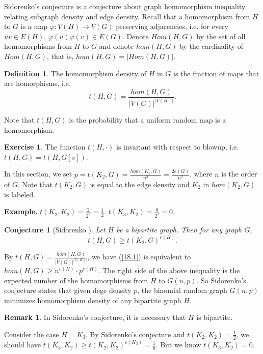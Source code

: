 \documentclass{article}
\newtheorem{conjecture}[theorem]{Conjecture}
\theoremstyle{definition}
\newtheorem{remark}[theorem]{Remark}
\newtheorem{definition}[theorem]{Definition}
\newtheorem{exercise}[theorem]{Exercise}
\renewcommand{\phi}{\varphi}
\begin{document}
Sidorenko's conjecture is a conjecture about graph homomorphism inequality relating subgraph density and edge density. Recall that a homomorphism from $H$ to $G$ is a map $\phi : V(H)\to V(G)$ preserving adjacencies, i.e. for every $uv\in E(H)$, $\phi(u)\phi(v)\in E(G)$. Denote $Hom(H,G)$ by the set of all homomorphisms from $H$ to $G$ and denote $hom(H,G)$ by the cardinality of $Hom(H,G)$, that is, $hom(H,G)=|Hom(H,G)|$.
	
\begin{definition}
	The homomorphism density of $H$ in $G$ is the fraction of maps that are homorphisms, i.e. 
	$$t(H,G)=\frac{hom(H,G)}{|V(G)|^{|V(H)|}}.$$
\end{definition}

Note that $t(H,G)$ is the probability that a uniform random map is a homomorphism.

\begin{exercise}
    The function $t(H,\cdot)$ is invariant with respect to blowup, i.e. $t(H,G)=t(H,G[s])$.
\end{exercise}

In this section, we set $p=t(K_2,G)=\frac{hom(K_2,G)}{n^2}=\frac{2e(G)}{n^2}$, where $n$ is the order of $G$. Note that $t(K_2, G)$ is equal to the edge density and $K_2$ in $hom(K_2,G)$ is labeled.

\textbf{Example.} $t(K_2,K_2)=\frac{2}{2^2}=\frac{1}{2}$. $t(K_3,K_2)=\frac{0}{2^3}=0.$

\begin{conjecture}[Sidorenko \cite{sidorenko1991inequalities}]
	Let $H$ be a bipartite graph. Then for any graph $G$, 
	\begin{equation}\label{18.1}
		t(H,G)\geq t(K_2,G)^{e(H)}.
	\end{equation}
\end{conjecture}

By $t(H,G)=\frac{hom(H,G)}{|V(G)|^{|V(H)|}}$, we have (\ref{18.1}) is equivalent to $hom(H,G)\geq n^{v(H)}\cdot p^{e(H)}$.
The right side of the above inequality is the expected number of the homomorphisms from $H$ to $G(n,p)$. So Sidorenko's conjecture states that given dege density $p$, the binomial random graph $G(n,p)$ minimizes homomorphism density of any bipartite graph $H$.

\begin{remark}
	In Sidorenko's conjecture, it is necessary that $H$ is bipartite.
\end{remark}

Consider the case $H=K_3$. By Sidorenko's conjecture and $t(K_2,K_2)=\frac{1}{2}$, we should have $t(K_3,K_2)\geq t(K_2,K_2)^{e(K_3)}=\frac{1}{8}$. But we know $t(K_3,K_2)=0.$
\end{document}

